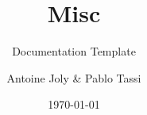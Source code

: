 \documentclass[Misc]{../../data/TelemacDoc} %
\begin{document}
\let\cleardoublepage\clearpage

\title{Misc}
\subtitle{Documentation Template}
\version{\telmaversion}
\author{Antoine Joly \& Pablo Tassi}
\date{\today}
\maketitle
\clearpage



\newpage

\thispagestyle{empty}

\TelemacCopyright{}




\pagestyle{empty} %

\tableofcontents%


\pagestyle{fancy} %










\end{document}
